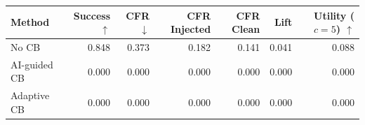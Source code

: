 \begin{tabular}{lrrrrrr}
\toprule
Method & Success $\uparrow$ & CFR $\downarrow$ & CFR Injected & CFR Clean & Lift & Utility ($c=5$) $\uparrow$ \\
\midrule
No CB & 0.848 & 0.373 & 0.182 & 0.141 & 0.041 & 0.088 \\
AI-guided CB & 0.000 & 0.000 & 0.000 & 0.000 & 0.000 & 0.000 \\
Adaptive CB & 0.000 & 0.000 & 0.000 & 0.000 & 0.000 & 0.000 \\
\bottomrule
\end{tabular}
